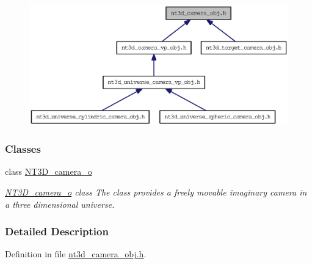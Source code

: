 \nopagebreak
\begin{figure}[H]
\begin{center}
\leavevmode
\includegraphics[width=400pt]{nt3d__camera__obj_8h__dep__incl}
\end{center}
\end{figure}
\subsubsection*{Classes}
\begin{DoxyCompactItemize}
\item 
class \hyperlink{class_n_t3_d__camera__o}{NT3D\_\-camera\_\-o}
\begin{DoxyCompactList}\small\item\em \hyperlink{class_n_t3_d__camera__o}{NT3D\_\-camera\_\-o} class The class provides a freely movable imaginary camera in a three dimensional universe. \item\end{DoxyCompactList}\end{DoxyCompactItemize}


\subsubsection{Detailed Description}


Definition in file \hyperlink{nt3d__camera__obj_8h_source}{nt3d\_\-camera\_\-obj.h}.

